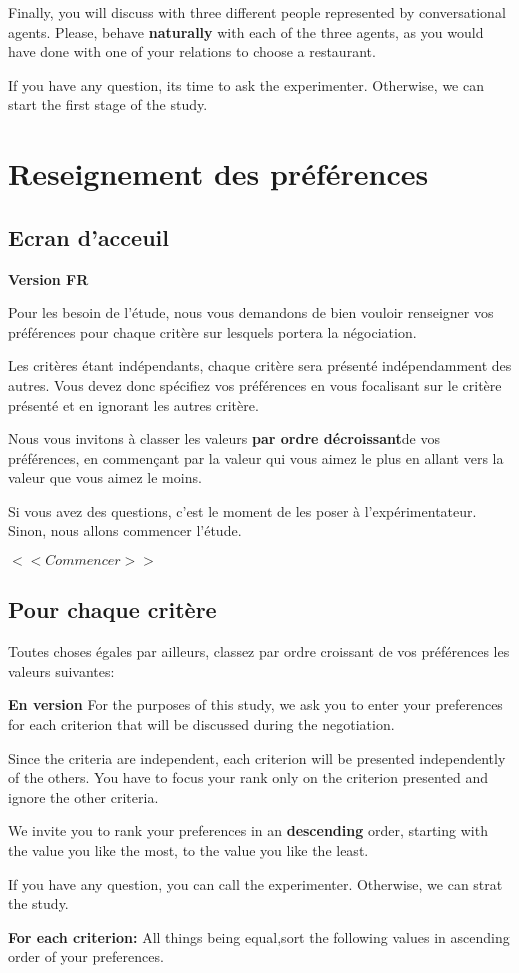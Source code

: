 \documentclass [french]{paper}
\begin{document}
		
		Finally, you will discuss with three different people represented by conversational agents. Please, behave \textbf{naturally} with each of the three agents, as you would have done with one of your relations to choose a restaurant.
	
		If you have any question, its time to ask the experimenter. Otherwise, we can start the first stage of the study.
	
		\section{Reseignement des préférences}
			\subsection{Ecran d'acceuil}
			
				\textbf{Version FR}
				
				
				Pour les besoin de l'étude, nous vous demandons de bien vouloir renseigner vos préférences pour chaque critère sur lesquels portera la négociation.
				
				Les critères étant indépendants, chaque critère sera présenté indépendamment des autres. Vous devez donc spécifiez vos préférences en vous focalisant sur le critère présenté et en ignorant les autres critère.
				
				Nous vous invitons à classer les valeurs \textbf{par ordre décroissant}de vos préférences, en commençant par la valeur qui vous aimez le plus en allant vers la valeur que vous aimez le moins.
				
			 Si vous avez des questions, c'est le moment de les poser à l'expérimentateur. Sinon, nous allons commencer l'étude.
				
				$<<Commencer>>$
				
	
		\subsection{Pour chaque critère}
			Toutes choses égales par ailleurs, classez par ordre croissant de vos préférences les valeurs suivantes: 
		

			
			\textbf{En version}
			For the purposes of this study, we ask you to enter your preferences for each criterion that will be discussed during the negotiation.
			
			Since the criteria are independent, each criterion will be presented independently of the others. You have to focus your rank only on the criterion presented and ignore the other criteria.
			
			We invite you to rank your preferences in an \textbf {descending} order, starting with the value you like the most,  to the value you like the least.
			
			If you have any question, you can call the experimenter. Otherwise, we can strat the study.
		
			
				\textbf{For each criterion:}  All things being equal,sort the following values in ascending order of your preferences.
		
	
\end{document}
